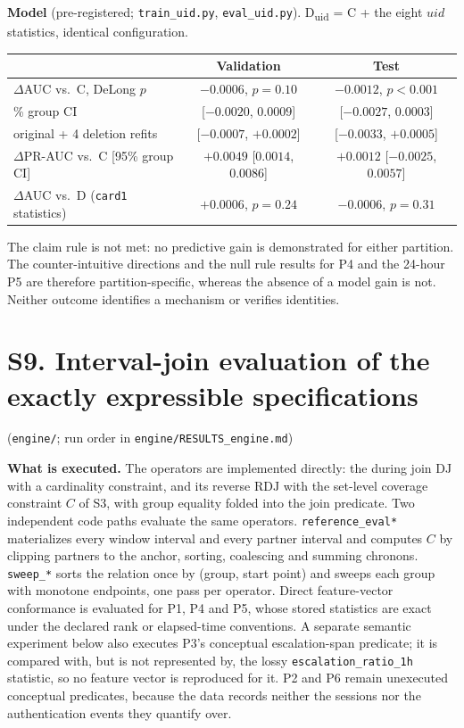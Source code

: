 \documentclass[10pt]{article}
\newcommand{\tf}[1]{\texttt{#1}}
\newcommand{\op}[1]{\mathrm{#1}}
\begin{document}
\textbf{Model} (pre-registered; \tf{train\_uid.py}, \tf{eval\_uid.py}). D\textsubscript{uid} = C + the eight $\mathit{uid}$ statistics, identical configuration.
\begin{center}\footnotesize
\begin{tabular}{@{}lcc@{}}
\toprule
 & Validation & Test \\
\midrule
$\Delta$AUC vs.\ C, DeLong $p$ & $-0.0006$, $p=0.10$ & $-0.0012$, $p<0.001$ \\
\quad 95\% group CI & [$-0.0020$, $0.0009$] & [$-0.0027$, $0.0003$] \\
\quad original + 4 deletion refits & [$-0.0007$, $+0.0002$] & [$-0.0033$, $+0.0005$] \\
$\Delta$PR-AUC vs.\ C [95\% group CI] & $+0.0049$ [$0.0014$, $0.0086$] & $+0.0012$ [$-0.0025$, $0.0057$] \\
$\Delta$AUC vs.\ D (\tf{card1} statistics) & $+0.0006$, $p=0.24$ & $-0.0006$, $p=0.31$ \\
\bottomrule
\end{tabular}\end{center}
The claim rule is not met: no predictive gain is demonstrated for either partition. The counter-intuitive directions and the null rule results for P4 and the 24-hour P5 are therefore partition-specific, whereas the absence of a model gain is not. Neither outcome identifies a mechanism or verifies identities.
\clearpage
\section*{S9. Interval-join evaluation of the exactly expressible specifications}
(\tf{engine/}; run order in \tf{engine/RESULTS\_engine.md})

\textbf{What is executed.} The operators are implemented directly: the during join $\op{DJ}$ with a cardinality constraint, and its reverse $\op{RDJ}$ with the set-level coverage constraint $C$ of S3, with group equality folded into the join predicate. Two independent code paths evaluate the same operators. \tf{reference\_eval*} materializes every window interval and every partner interval and computes $C$ by clipping partners to the anchor, sorting, coalescing and summing chronons. \tf{sweep\_*} sorts the relation once by (group, start point) and sweeps each group with monotone endpoints, one pass per operator. Direct feature-vector conformance is evaluated for P1, P4 and P5, whose stored statistics are exact under the declared rank or elapsed-time conventions. A separate semantic experiment below also executes P3's conceptual escalation-span predicate; it is compared with, but is not represented by, the lossy \tf{escalation\_ratio\_1h} statistic, so no feature vector is reproduced for it. P2 and P6 remain unexecuted conceptual predicates, because the data records neither the sessions nor the authentication events they quantify over.
\end{document}
